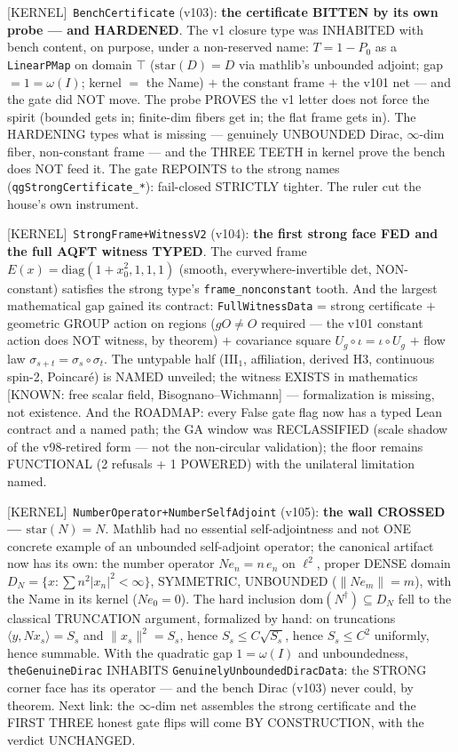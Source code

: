 \documentclass[11pt]{article}
\providecommand{\kernelmk}[1]{\textsf{[KERNEL]}~\texttt{#1}}\providecommand{\knownmk}[1]{\textsf{[KNOWN]}~{#1}}\providecommand{\statusmk}[1]{\textsf{[#1]}}
\theoremstyle{definition}\newtheorem{deriv}{Derivation}
\begin{document}
\kernelmk{BenchCertificate} (v103): \textbf{the certificate BITTEN by its own probe --- and HARDENED}. The v1 closure type was INHABITED with bench content, on purpose, under a non-reserved name: $T=1-P_0$ as a \texttt{LinearPMap} on domain $\top$ ($\mathrm{star}(D)=D$ via mathlib's unbounded adjoint; gap $=1=\omega(I)$; kernel $=$ the Name) $+$ the constant frame $+$ the v101 net --- and the gate did NOT move. The probe PROVES the v1 letter does not force the spirit (bounded gets in; finite-dim fibers get in; the flat frame gets in). The HARDENING types what is missing --- genuinely UNBOUNDED Dirac, $\infty$-dim fiber, non-constant frame --- and the THREE TEETH in kernel prove the bench does NOT feed it. The gate REPOINTS to the strong names (\texttt{qgStrongCertificate\_*}): fail-closed STRICTLY tighter. The ruler cut the house's own instrument.

\kernelmk{StrongFrame+\allowbreak WitnessV2} (v104): \textbf{the first strong face FED and the full AQFT witness TYPED}. The curved frame $E(x)=\mathrm{diag}(1+x_0^2,1,1,1)$ (smooth, everywhere-invertible det, NON-constant) satisfies the strong type's \texttt{frame\_nonconstant} tooth. And the largest mathematical gap gained its contract: \texttt{FullWitnessData} = strong certificate $+$ geometric GROUP action on regions ($gO\neq O$ required --- the v101 constant action does NOT witness, by theorem) $+$ covariance square $U_g\circ\iota=\iota\circ U_g$ $+$ flow law $\sigma_{s+t}=\sigma_s\circ\sigma_t$. The untypable half (III$_1$, affiliation, derived H3, continuous spin-2, Poincaré) is NAMED unveiled; the witness EXISTS in mathematics [KNOWN: free scalar field, Bisognano--Wichmann] --- formalization is missing, not existence. And the ROADMAP: every False gate flag now has a typed Lean contract and a named path; the GA window was RECLASSIFIED (scale shadow of the v98-retired form --- not the non-circular validation); the floor remains FUNCTIONAL (2 refusals + 1 POWERED) with the unilateral limitation named.

\kernelmk{NumberOperator+\allowbreak NumberSelfAdjoint} (v105): \textbf{the wall CROSSED --- $\mathrm{star}(N)=N$}. Mathlib had no essential self-adjointness and not ONE concrete example of an unbounded self-adjoint operator; the canonical artifact now has its own: the number operator $Ne_n=n\,e_n$ on $\ell^2$, proper DENSE domain $D_N=\{x:\sum n^2|x_n|^2<\infty\}$, SYMMETRIC, UNBOUNDED ($\|Ne_m\|=m$), with the Name in its kernel ($Ne_0=0$). The hard inclusion $\mathrm{dom}(N^\dagger)\subseteq D_N$ fell to the classical TRUNCATION argument, formalized by hand: on truncations $\langle y,Nx_s\rangle=S_s$ and $\|x_s\|^2=S_s$, hence $S_s\le C\sqrt{S_s}$, hence $S_s\le C^2$ uniformly, hence summable. With the quadratic gap $1=\omega(I)$ and unboundedness, \texttt{theGenuineDirac} INHABITS \texttt{GenuinelyUnboundedDiracData}: the STRONG corner face has its operator --- and the bench Dirac (v103) never could, by theorem. Next link: the $\infty$-dim net assembles the strong certificate and the FIRST THREE honest gate flips will come BY CONSTRUCTION, with the verdict UNCHANGED.
\end{document}
